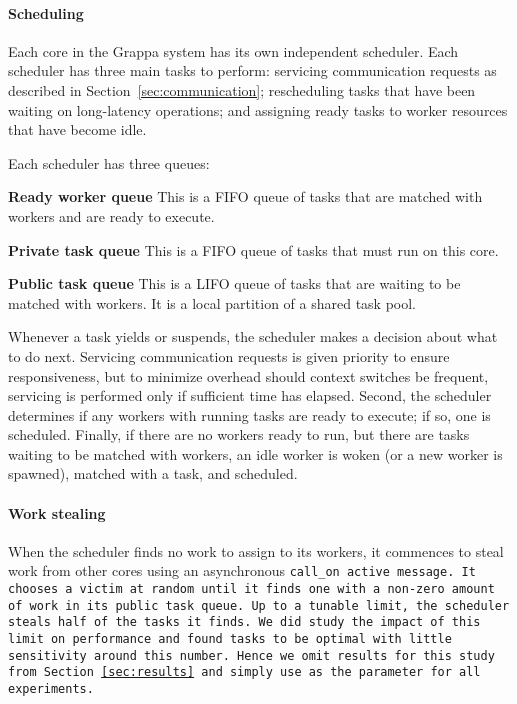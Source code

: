 \paragraph{Scheduling} Each core in the Grappa system has its own
independent scheduler. Each scheduler has three main tasks to perform:
servicing communication requests as described in
Section~\ref{sec:communication}; rescheduling tasks that have been
waiting on long-latency operations; and assigning ready tasks to
worker resources that have become idle.

Each scheduler has three queues:
\begin{description}
\item{\bf Ready worker queue} This is a FIFO queue of tasks that are
  matched with workers and are ready to execute.
\item{\bf Private task queue} This is a FIFO queue of tasks that must run on this core.
\item{\bf Public task queue} This is a LIFO queue of tasks that are
  waiting to be matched with workers. It is a local partition of a shared
  task pool.
\end{description}


Whenever a task yields or suspends, the scheduler makes a decision
about what to do next. Servicing communication requests is given priority
to ensure responsiveness, but to minimize overhead should context switches be frequent, servicing is performed only if sufficient time has elapsed.
Second, the scheduler determines if any workers with running tasks are
ready to execute; if so, one is scheduled. Finally, if there are no
workers ready to run, but there are tasks waiting to be matched with
workers, an idle worker is woken (or a new worker is spawned), matched
with a task, and scheduled.

\paragraph{Work stealing} 

When the scheduler finds no work to assign to its workers, it
commences to steal work from other cores using an asynchronous
\tt{call_on} active message.  It chooses a victim at random until it
finds one with a non-zero amount of work in its public task queue.  Up
to a tunable limit, the scheduler steals half of the tasks it finds.
We did study the impact of this limit on performance and found
 tasks to be optimal with little sensitivity around this
number.  Hence we omit results for this study from
Section~\ref{sec:results} and simply use  as the
parameter for all experiments.

